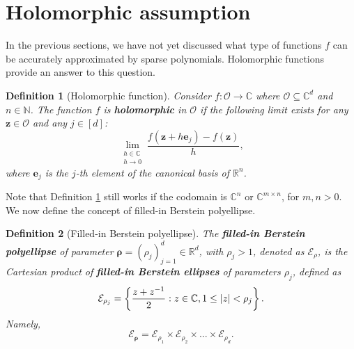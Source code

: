 \documentclass[12pt, oneside]{report}   	%
\newcommand{\R}{\mathbb{R}}
\newcommand{\C}{\mathbb{C}}
\newcommand{\N}{\mathbb{N}}
\newtheorem{defn}{Definition}
\DeclarePairedDelimiter{\abs}{\lvert}{\rvert}
\begin{document}
\section{Holomorphic assumption}
\label{sec:holomorphy}

In the previous sections, we have not yet discussed what type of functions $f$ can be accurately approximated by sparse polynomials. Holomorphic functions provide an answer to this question.

\begin{defn}[Holomorphic function]
\label{defn:holom}
Consider $f:\mathcal{O}\to\C$ where $\mathcal{O}\subseteq\C^d$ and $n\in\N$. The function $f$ is \textbf{holomorphic} in $\mathcal{O}$ if the following limit exists for any $\boldsymbol{z}\in\mathcal{O}$ and any $j\in[d]$:
$$
\lim_{\substack{h\in\C \\ h \to 0}} \frac{f(\boldsymbol{z}+h\boldsymbol{e}_j) - f(\boldsymbol{z})}{h},
$$
where $\boldsymbol{e}_j$ is the $j$-th element of the canonical basis of $\R^n$.
\end{defn}
\smallskip

\noindent Note that Definition \ref{defn:holom} still works if the codomain is $\C^n$ or $\C^{m\times n}$, for $m,n>0$. We now define the concept of filled-in Berstein polyellipse.

\begin{defn}[Filled-in Berstein polyellipse]
The \textbf{filled-in Berstein polyellipse} of parameter $\boldsymbol{\rho}=(\rho_j)_{j=1}^d\in\R^d$, with $\rho_j>1$, denoted as $\boldsymbol{\mathcal{E}}_\rho$, is the Cartesian product of \textbf{filled-in Berstein ellipses} of parameters $\rho_j$, defined as
$$
\mathcal{E}_{\rho_j} = \left\{ \frac{z+z^{-1}}{2}: z\in\C, 1\leq\abs{z}<\rho_j \right\}.
$$
Namely,
$$
\boldsymbol{\mathcal{E}_\rho} = \mathcal{E}_{\rho_1} \times \mathcal{E}_{\rho_2} \times ... \times \mathcal{E}_{\rho_d}.
$$
\end{defn}
\smallskip
\end{document}
